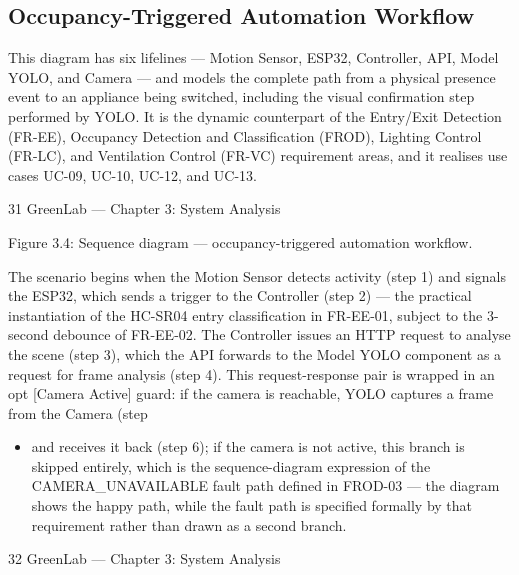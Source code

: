 \subsection{Occupancy-Triggered Automation Workflow}

This diagram has six lifelines --- Motion Sensor, ESP32, Controller, API, Model YOLO, and
Camera --- and models the complete path from a physical presence event to an appliance being
switched, including the visual confirmation step performed by YOLO. It is the dynamic
counterpart of the Entry/Exit Detection (FR-EE), Occupancy Detection and Classification (FROD), Lighting Control (FR-LC), and Ventilation Control (FR-VC) requirement areas, and it
realises use cases UC-09, UC-10, UC-12, and UC-13.




31
GreenLab --- Chapter 3: System Analysis




Figure 3.4: Sequence diagram --- occupancy-triggered automation workflow.

The scenario begins when the Motion Sensor detects activity (step 1) and signals the ESP32, which
sends a trigger to the Controller (step 2) --- the practical instantiation of the HC-SR04 entry
classification in FR-EE-01, subject to the 3-second debounce of FR-EE-02. The Controller issues
an HTTP request to analyse the scene (step 3), which the API forwards to the Model YOLO
component as a request for frame analysis (step 4). This request-response pair is wrapped in an opt
[Camera Active] guard: if the camera is reachable, YOLO captures a frame from the Camera (step
\begin{itemize}
  \item and receives it back (step 6); if the camera is not active, this branch is skipped entirely, which is
the sequence-diagram expression of the CAMERA_UNAVAILABLE fault path defined in FROD-03 --- the diagram shows the happy path, while the fault path is specified formally by that
requirement rather than drawn as a second branch.
\end{itemize}


32
GreenLab --- Chapter 3: System Analysis


